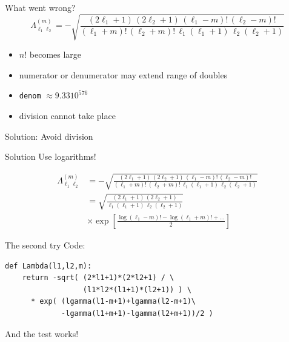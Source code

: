 \documentclass[12pt,compress,mathserif]{beamer}
\begin{document}
\begin{frame}{What went wrong?}
    \begin{equation}
    \nonumber
    \Lambda_{\ell_1 \ell_2}^{(m)} = 
    -\sqrt{ \frac{(2\ell_1+1)\,(2\ell_2+1)\,(\ell_1-m)!\,(\ell_2-m)!}{(\ell_1+m)!\, (\ell_2+m)!\, \ell_1(\ell_1+1) \, \ell_2(\ell_2+1)} }
    \end{equation}

    \vfill
    \begin{itemize}
        \item $n!$ becomes large
        \item numerator or denumerator may extend range of doubles
        \item \texttt{denom} $\approx 9.33 10^{576}$
        \item division cannot take place
    \end{itemize}

    \vfill
    Solution: Avoid division
\end{frame}

\begin{frame}{Solution}
    Use logarithms!

    \begin{align}
    \nonumber
    \Lambda_{\ell_1 \ell_2}^{(m)} &= 
    -\sqrt{ \frac{(2\ell_1+1)\,(2\ell_2+1)\,(\ell_1-m)!\,(\ell_2-m)!}{(\ell_1+m)!\, (\ell_2+m)!\, \ell_1(\ell_1+1) \, \ell_2(\ell_2+1)} } \\
    \nonumber
    &= \sqrt{\frac{(2\ell_1+1)\,(2\ell_2+1)}{\ell_1(\ell_1+1)\,\ell_2(\ell_2+1)}} \\
    \nonumber
    &\times \exp\left[{\frac{\log(\ell_1-m)!-\log(\ell_1+m)!+\dots}{2}}\right]
    \end{align}
\end{frame}
    
\begin{frame}[fragile]{The second try}
    Code:
    \begin{lstlisting}
def Lambda(l1,l2,m):
    return -sqrt( (2*l1+1)*(2*l2+1) / \
                  (l1*l2*(l1+1)*(l2+1)) ) \
      * exp( (lgamma(l1-m+1)+lgamma(l2-m+1)\
             -lgamma(l1+m+1)-lgamma(l2+m+1))/2 )
    \end{lstlisting}

    \only<2> {
        \begin{center}
        And the test works!
        \end{center}
        }
\end{frame}
\end{document}
